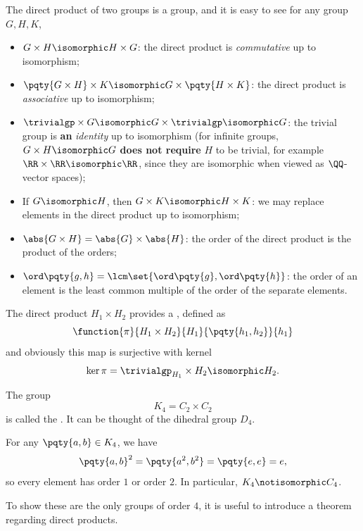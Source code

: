 The direct product of two groups is a group, and it is easy to see for any group \(G, H, K\),
\begin{itemize}
    \item \(G \times H \isomorphic H \times G\): the direct product is \emph{commutative} up to isomorphism;
    \item \(\pqty{G \times H} \times K \isomorphic G \times \pqty{H \times K}\): the direct product is \emph{associative} up to isomorphism;
    \item \(\trivialgp \times G \isomorphic G \times \trivialgp \isomorphic G\): the trivial group is \textbf{an} \emph{identity} up to isomorphism (for infinite groups, \(G \times H \isomorphic G\) \textbf{does not require} \(H\) to be trivial, for example \(\RR \times \RR \isomorphic \RR\), since they are isomorphic when viewed as \(\QQ\)-vector spaces);
    \item If \(G \isomorphic H\), then \(G \times K \isomorphic H \times K\): we may replace elements in the direct product up to isomorphism;
    \item \(\abs{G \times H} = \abs{G} \times \abs{H}\): the order of the direct product is the product of the orders;
    \item \(\ord\pqty{g, h} = \lcm\set{\ord\pqty{g}, \ord\pqty{h}}\): the order of an element is the least common multiple of the order of the separate elements.
\end{itemize}

\begin{remark}
    The direct product \(H_1 \times H_2\) provides a , defined as
    \[
        \function{\pi}{H_1 \times H_2}{H_1}{\pqty{h_1, h_2}}{h_1}
    \]
    and obviously this map is surjective with kernel
    \[
        \ker \pi = \trivialgp_{H_1} \times H_2 \isomorphic H_2.
    \]
\end{remark}

\begin{example*}
    The group
    \[
        K_4 = C_2 \times C_2
    \]
    is called the . It can be thought of the dihedral group \(D_4\).

    For any \(\pqty{a, b} \in K_4\), we have
    \[
        \pqty{a, b}^2 = \pqty{a^2, b^2} = \pqty{e, e} = e,
    \]
    so every element has order \(1\) or order \(2\). In particular, \(K_4 \notisomorphic C_4\).
\end{example*}

To show these are the only groups of order \(4\), it is useful to introduce a theorem regarding direct products.

